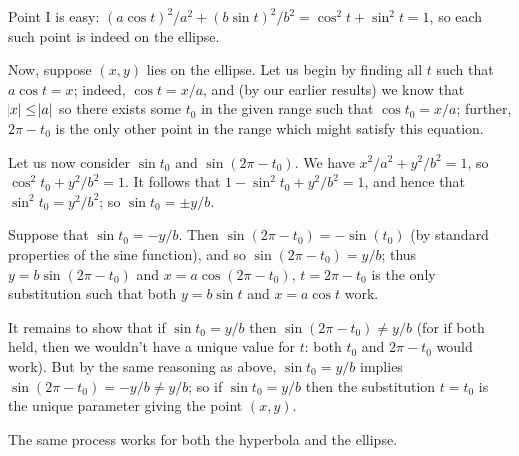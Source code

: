 \documentclass[a4paper,leqno,10pt]{article}
\theoremstyle{exercise}
\theoremstyle{plain}
\theoremstyle{definition}
\theoremstyle{remark}
\begin{document}
Point I is easy: $ (a \cos t)^2/a^2 + (b \sin t)^2/b^2 = \cos^2 t + \sin^2 t = 1 $, so each such point is indeed on the ellipse.

Now, suppose $ (x,y) $ lies on the ellipse. Let us begin by finding all $ t $ such that $ a \cos t = x $; indeed,
$ \cos t = x/a $, and (by our earlier results) we know that $ \abs{x} \leq \abs{a} $ so there exists some $ t_0 $ in the given range
such that $ \cos t_0 = x/a $; further, $ 2\pi - t_0 $ is the only other point in the range which might satisfy this equation.

Let us now consider $ \sin t_0 $ and $ \sin (2\pi - t_0) $. We have $ x^2/a^2 + y^2/b^2 = 1 $, so $ \cos^2 t_0 + y^2/b^2 = 1 $. It
follows that $ 1 - \sin^2 t_0 + y^2/b^2 = 1 $, and hence that $ \sin^2 t_0 = y^2/b^2 $; so $ \sin t_0 = \pm y/b $.

Suppose that $ \sin t_0 = -y/b $. Then $ \sin (2\pi - t_0) = -\sin(t_0) $ (by standard properties of the sine function),
and so $ \sin(2\pi - t_0) = y/b $; thus $ y = b\sin(2\pi - t_0) $ and $ x = a\cos(2\pi - t_0) $, $ t = 2\pi - t_0 $ is the
only substitution such that both $ y = b\sin t $ and $ x = a\cos t $ work.

It remains to show that if $ \sin t_0 = y/b $ then $ \sin (2\pi - t_0) \neq y/b $ (for if both held, then we wouldn't have
a unique value for $ t $: both $ t_0 $ and $ 2\pi - t_0 $ would work). But by the same reasoning as above, $ \sin t_0 = y/b $
implies $ \sin (2\pi - t_0) = -y/b \neq y/b $; so if $ \sin t_0 = y/b $ then the substitution $ t = t_0 $ is the unique parameter
giving the point $ (x,y) $.

The same process works for both the hyperbola and the ellipse.
\end{document}
